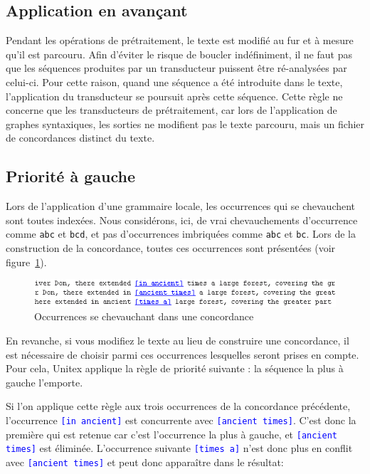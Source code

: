 \subsection{Application en avançant}
Pendant les opérations de prétraitement, le texte est modifié au fur et à mesure qu’il
est parcouru. Afin d’éviter le risque de boucler indéfiniment, il ne faut pas que les 
séquences produites par un transducteur puissent être ré-analysées par celui-ci. Pour cette
raison, quand une séquence a été introduite dans le texte, l’application du transducteur se
poursuit après cette séquence.
Cette règle ne concerne que les transducteurs de prétraitement, car lors de l’application
de graphes syntaxiques, les sorties ne modifient pas le texte parcouru, mais un fichier de
concordances distinct du texte.


\subsection{Priorité à gauche}
\label{section-priorite-gauche}
 
Lors de l’application d’une grammaire locale, les occurrences qui se chevauchent sont
toutes indexées.
Nous considérons, ici, de vrai chevauchements d'occurrence comme \verb+abc+ et \verb+bcd+, et
pas d'occurrences imbriquées comme \verb+abc+ et \verb+bc+.
Lors de la construction de la concordance, toutes ces occurrences sont présentées
(voir figure~\ref{fig-overlappping-occurrences}).

\begin{figure}[!h]
\begin{center}
\includegraphics[width=13cm]{resources/img/fig6-24.png}
\caption{Occurrences se chevauchant dans une concordance\label{fig-overlappping-occurrences}}
\end{center}
\end{figure}

\noindent En revanche, si vous modifiez le texte au lieu de construire une concordance, il est
nécessaire de choisir parmi ces occurrences lesquelles seront prises en compte. Pour cela, Unitex
 applique la règle de priorité suivante : la séquence la plus à gauche l’emporte.

\bigskip
\noindent Si l’on applique cette règle aux trois occurrences de la concordance précédente, l’occurrence \textcolor{blue}{\texttt{[in ancient]}} est concurrente avec 
\textcolor{blue}{\texttt{[ancient times]}}. C’est donc la première qui
est retenue car c’est l’occurrence la plus à gauche, et \textcolor{blue}{\texttt{[ancient times]}} est
éliminée. L’occurrence suivante  \textcolor{blue}{\texttt{[times a]}} n’est donc plus en conflit avec 
\textcolor{blue}{\texttt{[ancient times]}} et peut donc apparaître dans le résultat:

